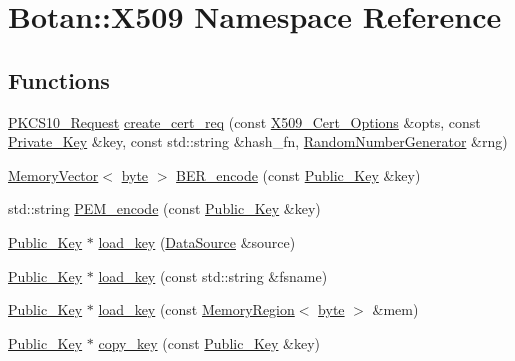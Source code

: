 \hypertarget{namespaceBotan_1_1X509}{\section{Botan\-:\-:X509 Namespace Reference}
\label{namespaceBotan_1_1X509}
}
\subsection*{Functions}
\begin{DoxyCompactItemize}
\item 
\hyperlink{classBotan_1_1PKCS10__Request}{P\-K\-C\-S10\-\_\-\-Request} \hyperlink{namespaceBotan_1_1X509_a916f188045a719b5aa0a22e7ee8a5ffa}{create\-\_\-cert\-\_\-req} (const \hyperlink{classBotan_1_1X509__Cert__Options}{X509\-\_\-\-Cert\-\_\-\-Options} \&opts, const \hyperlink{classBotan_1_1Private__Key}{Private\-\_\-\-Key} \&key, const std\-::string \&hash\-\_\-fn, \hyperlink{classBotan_1_1RandomNumberGenerator}{Random\-Number\-Generator} \&rng)
\item 
\hyperlink{classBotan_1_1MemoryVector}{Memory\-Vector}$<$ \hyperlink{namespaceBotan_a7d793989d801281df48c6b19616b8b84}{byte} $>$ \hyperlink{namespaceBotan_1_1X509_a48f30a11fcd0ba50a2322c2cc168015a}{B\-E\-R\-\_\-encode} (const \hyperlink{classBotan_1_1Public__Key}{Public\-\_\-\-Key} \&key)
\item 
std\-::string \hyperlink{namespaceBotan_1_1X509_a0ddc0efdb36dbf775605fdbf614a4bbe}{P\-E\-M\-\_\-encode} (const \hyperlink{classBotan_1_1Public__Key}{Public\-\_\-\-Key} \&key)
\item 
\hyperlink{classBotan_1_1Public__Key}{Public\-\_\-\-Key} $\ast$ \hyperlink{namespaceBotan_1_1X509_a959b7ea8d6ac4469e89a84a765ab71c6}{load\-\_\-key} (\hyperlink{classBotan_1_1DataSource}{Data\-Source} \&source)
\item 
\hyperlink{classBotan_1_1Public__Key}{Public\-\_\-\-Key} $\ast$ \hyperlink{namespaceBotan_1_1X509_a4490bb13ea880513d80b1403ae6f7939}{load\-\_\-key} (const std\-::string \&fsname)
\item 
\hyperlink{classBotan_1_1Public__Key}{Public\-\_\-\-Key} $\ast$ \hyperlink{namespaceBotan_1_1X509_abaa2f6c98963ceab43435bf29c3730b8}{load\-\_\-key} (const \hyperlink{classBotan_1_1MemoryRegion}{Memory\-Region}$<$ \hyperlink{namespaceBotan_a7d793989d801281df48c6b19616b8b84}{byte} $>$ \&mem)
\item 
\hyperlink{classBotan_1_1Public__Key}{Public\-\_\-\-Key} $\ast$ \hyperlink{namespaceBotan_1_1X509_a92e0576fe7b61d06001c0424b5f1ee39}{copy\-\_\-key} (const \hyperlink{classBotan_1_1Public__Key}{Public\-\_\-\-Key} \&key)

\end{DoxyCompactItemize}
